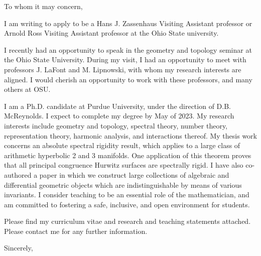 \documentclass[a4paper,oneside,10pt]{letter}
\date{}
\makeatletter
\renewcommand{\closing}[1]{\par\nobreak\vspace{\parskip}%
  \stopbreaks
  \noindent
  \ifx\@empty\fromaddress\else
  \hspace*{\longindentation}\fi
  \parbox{\indentedwidth}{\raggedright
       \ignorespaces #1\\[2\medskipamount]%
       \ifx\@empty\fromsig
           \fromname
       \else \fromsig \fi\strut}%
   \par}
\makeatother
\begin{document}
\begin{letter}{}

\opening{To whom it may concern,} %
I am writing to apply to be a Hans J. Zassenhaus Visiting Assistant professor or Arnold Ross Visiting Assistant professor at the Ohio State university. 

I recently had an opportunity to speak in the geometry and topology seminar at the Ohio State University. During my visit, I had an opportunity to meet with professors J. LaFont and M. Lipnowski, with whom my research interests are aligned.  I would cherish an opportunity to work with these professors, and many others at OSU. 

I am a Ph.D. candidate at Purdue University, under the direction of D.B. McReynolds. I expect to complete my degree by May of 2023. My research interests include geometry and topology, spectral theory, number theory, representation theory, harmonic analysis, and interactions thereof. My thesis work concerns an absolute spectral rigidity result, which applies to a large class of arithmetic hyperbolic 2 and 3 manifolds.  One application of this theorem proves that all principal congruence Hurwitz surfaces are spectrally rigid. I have also co-authored a paper in which we construct large collections of algebraic and differential geometric objects which are indistinguishable by means of various invariants. I consider teaching to be an essential role of the mathematician, and am committed to fostering a safe, inclusive, and open environment for students.  

Please find my curriculum vitae and research and teaching statements attached.  Please contact me for any further information. 



\closing{Sincerely,} %


\end{letter}
\end{document}
